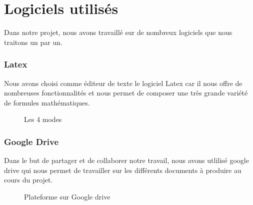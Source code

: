	\section{Logiciels utilisés}
	Dans notre projet, nous avons travaillé sur de nombreux logiciels que nous traitons un par un.
	\subsubsection{Latex}
	Nous avons choisi comme éditeur de texte le logiciel Latex car il nous  offre de nombreuses fonctionnalités et nous permet de composer une très grande variété de formules mathématiques.
	\begin{figure}[h]
		\begin{center}
			\centering
		\end{center}
		\caption{Les 4 modes}
	\end{figure}
	\subsubsection{Google Drive}
	Dans le but de partager et de collaborer notre travail, nous avons utlilisé google drive qui nous permet de travailler sur les différents documents à produire au cours du projet.
	\begin{figure}[h]
		\begin{center}
			\centering
		\end{center}
		\caption{Plateforme sur Google drive}
	\end{figure}
